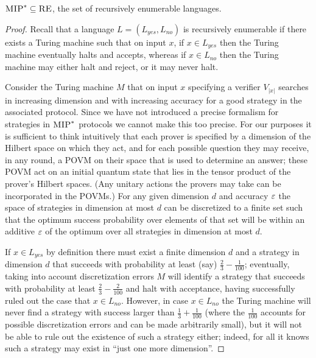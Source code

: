 \begin{lemma}\label{lem:mip-in-re}
$\textsc{MIP}^* \subseteq \textsc{RE}$, the set of recursively enumerable languages. 
\end{lemma} 

\begin{proof}
Recall that a language $L=(L_{yes},L_{no})$ is recursively enumerable if there exists a Turing machine such that on input $x$, if $x\in L_{yes}$ then the Turing machine eventually halts and accepts, whereas if $x\in L_{no}$ then the Turing machine may either halt and reject, or it may never halt. 

Consider the Turing machine $M$ that on input $x$ specifying a verifier $V_{|x|}$ searches in increasing dimension and with increasing accuracy for a good strategy in the associated protocol. Since we have not introduced a precise formalism for strategies in $\textsc{MIP}^*$ protocols we cannot make this too precise. For our purposes  it is sufficient to think intuitively that each prover is specified by a dimension of the Hilbert space on which they act, and for each possible question they may receive, in any round, a POVM on their space that is used to determine an answer; these POVM act on an initial quantum state that lies in the tensor product of the prover's Hilbert spaces. (Any unitary actions the provers may take can be incorporated in the POVMs.) For any given dimension $d$ and accuracy $\varepsilon$ the space of strategies in dimension at most $d$ can be discretized to a finite set such that the optimum success probability over elements of that set will be within an additive $\varepsilon$ of the optimum over all strategies in dimension at most $d$. 

If $x\in L_{yes}$ by definition there must exist a finite dimension $d$ and a strategy in dimension $d$ that succeeds with probability at least (say) $\frac{2}{3}-\frac{1}{100}$; eventually, taking into account discretization errors $M$ will identify a strategy that succeeds with probability at least $\frac{2}{3}-\frac{2}{100}$ and halt with acceptance, having successfully ruled out the case that $x\in L_{no}$. However, in case $x\in L_{no}$ the Turing machine will never find a strategy with success larger than $\frac{1}{3} + \frac{1}{100}$ (where the $\frac{1}{100}$ accounts for possible discretization errors and can be made arbitrarily small), but it will not be able to rule out the existence of such a strategy either; indeed, for all it knows such a strategy may exist in ``just one more dimension''. 
\end{proof}

